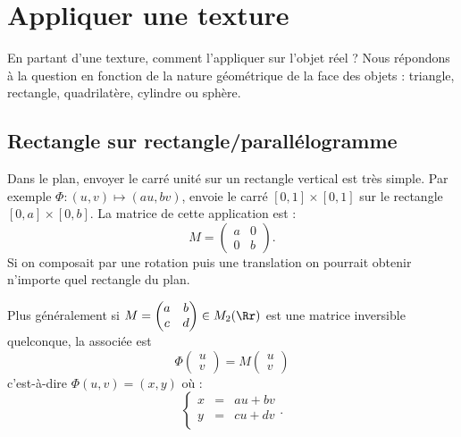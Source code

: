 \documentclass[11pt,class=report,crop=false]{standalone}
\begin{document}
\section{Appliquer une texture}

En partant d'une texture, comment l'appliquer sur l'objet réel ? Nous répondons à la question en fonction de la nature géométrique de la face des objets : triangle, rectangle, quadrilatère, cylindre ou sphère.


\subsection{Rectangle sur rectangle/parallélogramme}

Dans le plan, envoyer le carré unité sur un rectangle vertical est très simple. Par exemple $\Phi : (u,v) \mapsto (au,bv)$, envoie le carré $[0,1] \times [0,1]$ sur le rectangle $[0,a] \times [0,b]$. La matrice de cette application est :
$$M = \begin{pmatrix} a & 0 \\ 0 & b \end{pmatrix}.$$
Si on composait par une rotation puis une translation on pourrait obtenir n'importe quel rectangle du plan.


\medskip

Plus généralement si $M = \begin{pmatrix} a & b \\ c & d \end{pmatrix}\in M_2(\Rr)$ est une matrice inversible quelconque, la  associée est
$$\Phi \begin{pmatrix} u \\ v \end{pmatrix} = M \begin{pmatrix} u \\ v \end{pmatrix}$$
c'est-à-dire $\Phi(u,v)= (x,y)$ où :
$$\left\{
\begin{array}{rcl}
	x &=& au+bv \\
	y &=& cu+dv \\
\end{array}	
\right..$$
\end{document}
